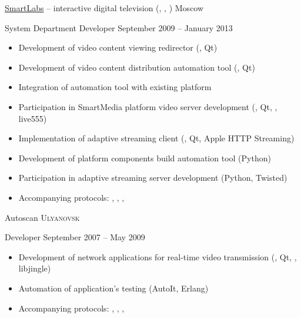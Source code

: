 \documentclass[unicode, 10pt, a4paper, oneside, fleqn]{article}
\begin{document}
\job  %
    {\href{http://www.smartlabs.tv}{SmartLabs} -- interactive digital
           television (, , )}
    {Moscow}
    {
        \position %
            {System Department Developer}
            {September 2009 -- January 2013}
            {
                \begin{itemize}
                    \item{Development of video content viewing redirector (\CPP, Qt)}
                    \item{Development of video content distribution automation tool (\CPP, Qt)}
                    \item{Integration of automation tool with existing platform}
                    \item{Participation in SmartMedia platform video server development
                          (\CPP, Qt, , live555)}
                    \item{Implementation of adaptive streaming client (\CPP, Qt, Apple HTTP Streaming)}
                    \item{Development of platform components build automation tool (Python)}
                    \item{Participation in adaptive streaming server development
                          (Python, Twisted)}
                    \item{Accompanying protocols: , ,
                          , }
                \end{itemize}
            }
    }


\job
    {Autoscan}
    {\textsc{Ulyanovsk}}
    {
        \position
            {Developer}
            {September 2007 -- May 2009}
            {
                \begin{itemize}
                    \item{Development of network applications for real-time video
                          transmission (\CPP, Qt, , libjingle)}
                    \item{Automation of application's testing (AutoIt, Erlang)}
                    \item{Accompanying protocols: , , ,
                          }
                \end{itemize}
            }
    }
\end{document}
